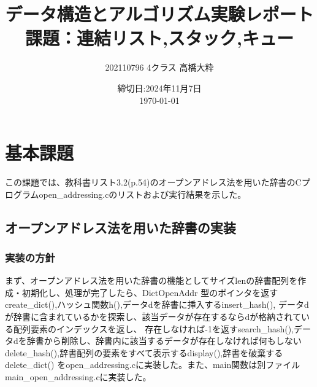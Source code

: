 \documentclass{ltjsarticle}
\begin{document}
\title{データ構造とアルゴリズム実験レポート\\
課題：連結リスト,スタック,キュー}
\author{202110796 4クラス 高橋大粋}
\date{締切日:2024年11月7日\\
\today}
\maketitle

\section{基本課題}
この課題では、教科書リスト3.2(p.54)のオープンアドレス法を用いた辞書のCプログラムopen\_addressing.cのリストおよび実行結果を示した。
\subsection{オープンアドレス法を用いた辞書の実装}
\subsubsection{実装の方針}\label{subsubsec:実装の方針1}
まず、オープンアドレス法を用いた辞書の機能としてサイズlenの辞書配列を作成・初期化し、処理が完了したら、DictOpenAddr
型のポインタを返すcreate\_dict(),ハッシュ関数h(),データdを辞書に挿入するinsert\_hash(),
データdが辞書に含まれているかを探索し、該当データが存在するならdが格納されている配列要素のインデックスを返し、
存在しなければ-1を返すsearch\_hash(),データdを辞書から削除し、辞書内に該当するデータが存在しなければ何もしない
delete\_hash(),辞書配列の要素をすべて表示するdisplay(),辞書を破棄するdelete\_dict()
をopen\_addressing.cに実装した。また、main関数は別ファイルmain\_open\_addressing.cに実装した。
\end{document}
